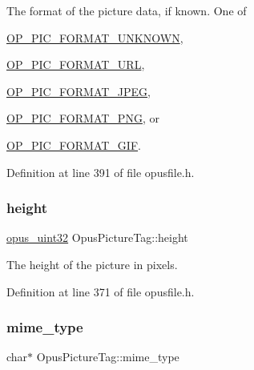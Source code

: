 The format of the picture data, if known. One of 
\begin{DoxyItemize}
\item \mbox{\hyperlink{group__header__info_gade2f09dce6330529fc3c96d1740df653}{O\+P\+\_\+\+P\+I\+C\+\_\+\+F\+O\+R\+M\+A\+T\+\_\+\+U\+N\+K\+N\+O\+WN}}, 
\item \mbox{\hyperlink{group__header__info_gaac4ef30a33caf090b9b1a5ada8f48204}{O\+P\+\_\+\+P\+I\+C\+\_\+\+F\+O\+R\+M\+A\+T\+\_\+\+U\+RL}}, 
\item \mbox{\hyperlink{group__header__info_gaf75ae037b78a4a048359261439395450}{O\+P\+\_\+\+P\+I\+C\+\_\+\+F\+O\+R\+M\+A\+T\+\_\+\+J\+P\+EG}}, 
\item \mbox{\hyperlink{group__header__info_ga703554b177ae75bd6999bbd30d485d3f}{O\+P\+\_\+\+P\+I\+C\+\_\+\+F\+O\+R\+M\+A\+T\+\_\+\+P\+NG}}, or 
\item \mbox{\hyperlink{group__header__info_gaa7d5e8cb675cb2da840f258b761e7781}{O\+P\+\_\+\+P\+I\+C\+\_\+\+F\+O\+R\+M\+A\+T\+\_\+\+G\+IF}}. 
\end{DoxyItemize}

Definition at line 391 of file opusfile.\+h.

\mbox{\label{struct_opus_picture_tag_a2de29a7eef41d13031c70786665eb638}} 
\subsubsection{\texorpdfstring{height}{height}}
{\footnotesize\ttfamily \mbox{\hyperlink{opus__types_8h_a643eaaadb9ef6cd44308e0299d8cd8ce}{opus\+\_\+uint32}} Opus\+Picture\+Tag\+::height}

The height of the picture in pixels. 

Definition at line 371 of file opusfile.\+h.

\mbox{\label{struct_opus_picture_tag_ace7f4978d815b186f6aebefed938c9e2}} 
\subsubsection{\texorpdfstring{mime\_type}{mime\_type}}
{\footnotesize\ttfamily char$\ast$ Opus\+Picture\+Tag\+::mime\+\_\+type}

